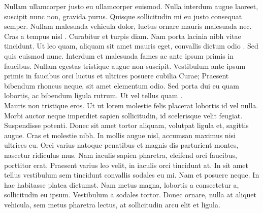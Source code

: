 \documentclass[a4paper,12pt]{article}
\begin{document}
Nullam ullamcorper justo eu ullamcorper euismod. Nulla interdum augue laoreet, suscipit nunc non, gravida purus. Quisque sollicitudin mi eu justo consequat semper. Nullam malesuada vehicula dolor, luctus ornare mauris malesuada nec. Cras a tempus nisl \cite{RN398}. Curabitur et turpis diam. Nam porta lacinia nibh vitae tincidunt. Ut leo quam, aliquam sit amet mauris eget, convallis dictum odio \cite{RN1022}. Sed quis euismod nunc. Interdum et malesuada fames ac ante ipsum primis in faucibus. Nullam egestas tristique augue non suscipit. Vestibulum ante ipsum primis in faucibus orci luctus et ultrices posuere cubilia Curae; Praesent bibendum rhoncus neque, sit amet elementum odio. Sed porta dui eu quam lobortis, ac bibendum ligula rutrum. Ut vel tellus quam \cite{RN635,RN1142}.\\
Mauris non tristique eros. Ut ut lorem molestie felis placerat lobortis id vel nulla. Morbi auctor neque imperdiet sapien sollicitudin, id scelerisque velit feugiat. Suspendisse potenti. Donec sit amet tortor aliquam, volutpat ligula et, sagittis augue. Cras et molestie nibh. In mollis augue nisl, accumsan maximus nisi ultrices eu. Orci varius natoque penatibus et magnis dis parturient montes, nascetur ridiculus mus. Nam iaculis sapien pharetra, eleifend orci faucibus, porttitor erat. Praesent varius leo velit, in iaculis orci tincidunt at. In sit amet tellus vestibulum sem tincidunt convallis sodales eu mi. Nam et posuere neque. In hac habitasse platea dictumst. Nam metus magna, lobortis a consectetur a, sollicitudin eu ipsum. Vestibulum a sodales tortor. Donec ornare, nulla at aliquet vehicula, sem metus pharetra lectus, at sollicitudin arcu elit et ligula.\\


\end{document}

